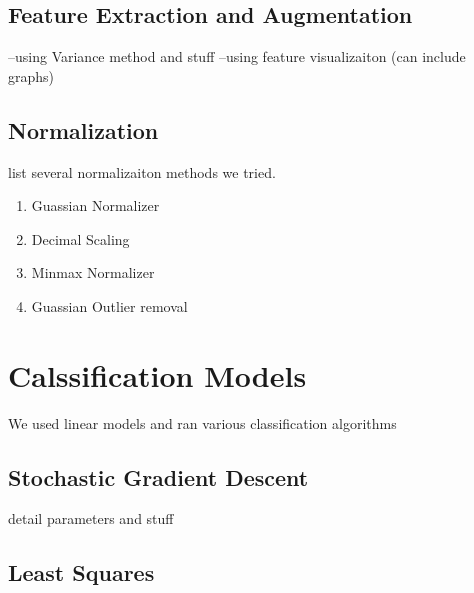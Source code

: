 \documentclass[10pt,conference,compsocconf]{IEEEtran}
\begin{document}
\subsection{Feature Extraction and Augmentation}
--using Variance method and stuff
--using feature visualizaiton (can include graphs)

\subsection{Normalization}
list several normalizaiton methods we tried.
\begin{enumerate}
\item Guassian Normalizer
\item Decimal Scaling
\item Minmax Normalizer
\item Guassian Outlier removal
\end{enumerate}

\section{Calssification Models}
\label{sec:ClassModels}

We used linear models and ran various classification algorithms

\subsection{Stochastic Gradient Descent}
detail parameters and stuff

\subsection{Least Squares}
\end{document}

